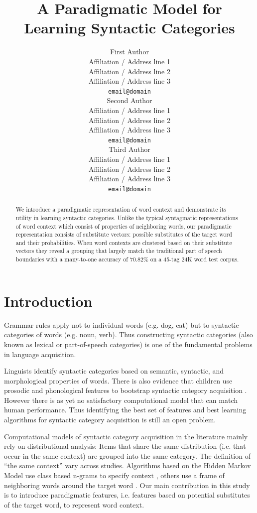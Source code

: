 \documentclass[11pt]{article}
\title{A Paradigmatic Model for Learning Syntactic Categories}
\author{First Author \\
  Affiliation / Address line 1 \\
  Affiliation / Address line 2 \\
  Affiliation / Address line 3 \\
  {\tt email@domain} \\\And
  Second Author \\
  Affiliation / Address line 1 \\
  Affiliation / Address line 2 \\
  Affiliation / Address line 3 \\
  {\tt email@domain} \\\And
  Third Author \\
  Affiliation / Address line 1 \\
  Affiliation / Address line 2 \\
  Affiliation / Address line 3 \\
  {\tt email@domain} \\}
\date{}
\newcommand{\collapseResult}{70.82}
\begin{document}
\maketitle
\begin{abstract}
We introduce a paradigmatic representation of word context and
demonstrate its utility in learning syntactic categories.  Unlike the
typical syntagmatic representations of word context which consist of
properties of neighboring words, our paradigmatic representation
consists of substitute vectors: possible substitutes of the target
word and their probabilities.  When word contexts are clustered based
on their substitute vectors they reveal a grouping that largely match
the traditional part of speech boundaries with a many-to-one accuracy
of \collapseResult\% on a 45-tag 24K word test corpus.
\end{abstract}

\section{Introduction}
\label{sec:intro}

Grammar rules apply not to individual words (e.g. dog, eat) but to
syntactic categories of words (e.g. noun, verb).  Thus constructing
syntactic categories (also known as lexical or part-of-speech
categories) is one of the fundamental problems in language
acquisition.

Linguists identify syntactic categories based on semantic, syntactic,
and morphological properties of words.  There is also evidence that
children use prosodic and phonological features to bootstrap syntactic
category acquisition \cite{ambridge2011child}.  However there is as
yet no satisfactory computational model that can match human
performance.  Thus identifying the best set of features and best
learning algorithms for syntactic category acquisition is still an
open problem.

Computational models of syntactic category acquisition in the
literature mainly rely on distributional analysis: Items that share
the same distribution (i.e. that occur in the same context) are
grouped into the same category.  The definition of ``the same
context'' vary across studies.  Algorithms based on the Hidden Markov
Model use class based n-grams to specify context
\cite{Brown:1992:CNG:176313.176316}, others use a frame of neighboring
words around the target word \cite{Schutze:1995:DPT:976973.976994}.
Our main contribution in this study is to introduce paradigmatic
features, i.e. features based on potential substitutes of the target
word, to represent word context.
\end{document}
